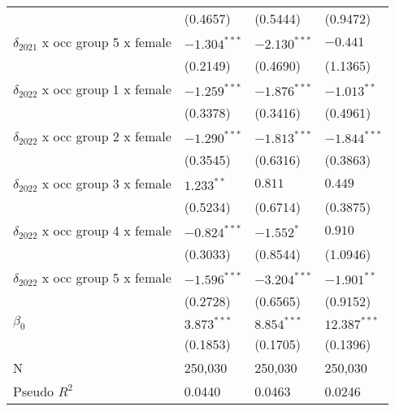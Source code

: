 \begin{tabular}{llll}
                                         &           (0.4657) &           (0.5444) &           (0.9472) \\
$\delta_{2021}$ x occ group 5 x female   &     $-1.304^{***}$ &     $-2.130^{***}$ &           $-0.441$ \\
                                         &           (0.2149) &           (0.4690) &           (1.1365) \\
$\delta_{2022}$ x occ group 1 x female   &     $-1.259^{***}$ &     $-1.876^{***}$ &      $-1.013^{**}$ \\
                                         &           (0.3378) &           (0.3416) &           (0.4961) \\
$\delta_{2022}$ x occ group 2 x female   &     $-1.290^{***}$ &     $-1.813^{***}$ &     $-1.844^{***}$ \\
                                         &           (0.3545) &           (0.6316) &           (0.3863) \\
$\delta_{2022}$ x occ group 3 x female   &       $1.233^{**}$ &            $0.811$ &            $0.449$ \\
                                         &           (0.5234) &           (0.6714) &           (0.3875) \\
$\delta_{2022}$ x occ group 4 x female   &     $-0.824^{***}$ &         $-1.552^*$ &            $0.910$ \\
                                         &           (0.3033) &           (0.8544) &           (1.0946) \\
$\delta_{2022}$ x occ group 5 x female   &     $-1.596^{***}$ &     $-3.204^{***}$ &      $-1.901^{**}$ \\
                                         &           (0.2728) &           (0.6565) &           (0.9152) \\
$\beta_0$                                &      $3.873^{***}$ &      $8.854^{***}$ &     $12.387^{***}$ \\
                                         &           (0.1853) &           (0.1705) &           (0.1396) \\
N                                        &            250,030 &            250,030 &            250,030 \\
Pseudo $R^2$                             &             0.0440 &             0.0463 &             0.0246 \\
\bottomrule
\end{tabular}
